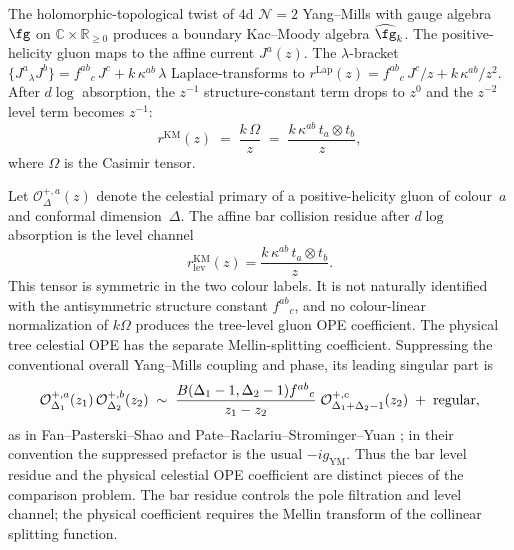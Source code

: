 The holomorphic-topological twist of $4$d $\mathcal{N} = 2$ Yang--Mills with gauge algebra $\fg$ on $\mathbb{C} \times \mathbb{R}_{\ge 0}$ produces a boundary Kac--Moody algebra $\widehat{\fg}_k$. The positive-helicity gluon maps to the affine current $J^a(z)$. The $\lambda$-bracket $\{J^a {}_\lambda J^b\} = f^{ab}{}_c\, J^c + k\,\kappa^{ab}\,\lambda$ Laplace-transforms to $r^{\mathrm{Lap}}(z) = f^{ab}{}_c\, J^c / z + k\,\kappa^{ab}/z^2$. After $d\log$ absorption, the $z^{-1}$ structure-constant term drops to $z^0$ and the $z^{-2}$ level term becomes $z^{-1}$:
\[
r^{\mathrm{KM}}(z) \;=\; \frac{k\,\Omega}{z}
\;=\; \frac{k\,\kappa^{ab}\,t_a \otimes t_b}{z},
\]
where $\Omega$ is the Casimir tensor.

\begin{theorem}
\label{thm:ch-core-celestial-gluon-ope}
Let $\mathcal{O}^{+,a}_{\Delta}(z)$ denote the celestial primary of a positive-helicity gluon
of colour~$a$ and conformal dimension~$\Delta$. The affine bar collision residue after
$d\log$ absorption is the level channel
\[
r^{\mathrm{KM}}_{\mathrm{lev}}(z)=\frac{k\,\kappa^{ab}\,t_a\otimes t_b}{z}.
\]
This tensor is symmetric in the two colour labels. It is not naturally identified with the
antisymmetric structure constant \(f^{ab}{}_{c}\), and no colour-linear normalization of
\(k\Omega\) produces the tree-level gluon OPE coefficient. The physical tree celestial OPE
has the separate Mellin-splitting coefficient. Suppressing the conventional overall
Yang--Mills coupling and phase, its leading singular part is
\[
\mathcal{O}^{+,a}_{\Delta_1}(z_1)\,\mathcal{O}^{+,b}_{\Delta_2}(z_2)
\;\sim\;
\frac{B(\Delta_1-1,\Delta_2-1)f^{ab}{}_c}{z_1 - z_2}\;
\mathcal{O}^{+,c}_{\Delta_1 + \Delta_2 - 1}(z_2)
\;+\; \textup{regular},
\]
as in Fan--Pasterski--Shao and Pate--Raclariu--Strominger--Yuan
\cite{FanPasterskiShaoCelOPE,PateRaclariuStromingerYuan19}; in their convention the
suppressed prefactor is the usual \(-ig_{\mathrm{YM}}\). Thus the bar level residue and the
physical celestial OPE coefficient are distinct pieces of the comparison problem. The bar
residue controls the pole filtration and level channel; the physical coefficient requires
the Mellin transform of the collinear splitting function.
\end{theorem}

